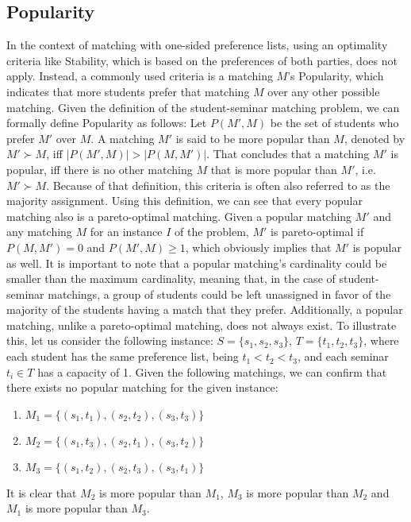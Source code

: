 \subsection{Popularity}
In the context of matching with one-sided preference lists, using an optimality criteria like Stability, which is based on the preferences of both parties, does not apply. Instead, a commonly used criteria is a matching $M$'s Popularity, which indicates that more students prefer that matching $M$ over any other possible matching.\cite{ManlovePopularMatchings} Given the definition of the student-seminar matching problem, we can formally define Popularity as follows:
Let $P(M', M)$ be the set of students who prefer $M'$ over $M$. A matching $M'$ is said to be more popular than $M$, denoted by $M' \succ M$, iff $|P(M', M)| > |P(M, M')|$. That concludes that a matching $M'$ is popular, iff there is no other matching $M$ that is more popular than $M'$, i.e. $M' \succ M$.\cite{Klaus, AbrahamPopular} Because of that definition, this criteria is often also referred to as the majority assignment.\cite{Gardenfors}
\newline
Using this definition, we can see that every popular matching also is a pareto-optimal matching. Given a popular matching $M'$ and any matching $M$ for an instance $I$ of the problem, $M'$ is pareto-optimal if $P(M, M') = 0$ and $P(M', M) \geq 1$, which obviously implies that $M'$ is popular as well.\cite{Klaus}
\newline
It is important to note that a popular matching's cardinality could be smaller than the maximum cardinality, meaning that, in the case of student-seminar matchings, a group of students could be left unassigned in favor of the majority of the students having a match that they prefer.
Additionally, a popular matching, unlike a pareto-optimal matching, does not always exist. To illustrate this, let us consider the following instance: $S=\{s_1, s_2, s_3\}$, $T=\{t_1, t_2, t_3\}$, where each student has the same preference list, being $t_1 < t_2 < t_3$, and each seminar $t_i \in T$ has a capacity of 1. Given the following matchings, we can confirm that there exists no popular matching for the given instance: 
\begin{enumerate}
    \item $M_1=\{(s_1, t_1), (s_2, t_2), (s_3, t_3)\}$
    \item $M_2=\{(s_1, t_3), (s_2, t_1), (s_3, t_2)\}$
    \item $M_3=\{(s_1, t_2), (s_2, t_3), (s_3, t_1)\}$
\end{enumerate}
It is clear that $M_2$ is more popular than $M_1$, $M_3$ is more popular than $M_2$ and $M_1$ is more popular than $M_3$.\cite{AbrahamPopular}

